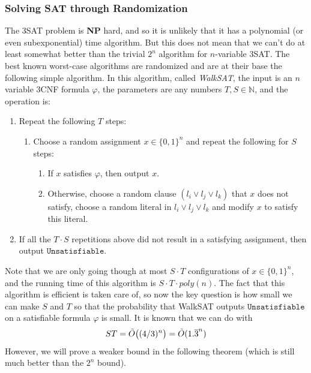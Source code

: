   \subsubsection{Solving SAT through Randomization}
  The 3SAT problem is \textbf{NP} hard, and so it is unlikely that it has a polynomial (or even subexponential) time algorithm. But this does not mean that we can't do at least somewhat better than the trivial $2^n$ algorithm for $n$-variable 3SAT. The best known worst-case algorithms are randomized and are at their base the following simple algorithm. In this algorithm, called \textit{WalkSAT}, the input is an $n$ variable 3CNF formula $\varphi$, the parameters are any numbers $T, S \in \mathbb{N}$, and the operation is: 
  \begin{enumerate}
      \item Repeat the following $T$ steps: 
      \begin{enumerate}
          \item Choose a random assignment $x \in \{0,1\}^n$ and repeat the following for $S$ steps: 
          \begin{enumerate}
              \item If $x$ satisfies $\varphi$, then output $x$. 
              \item Otherwise, choose a random clause $(l_i \vee l_j \vee l_k)$ that $x$ does not satisfy, choose a random literal in $l_i \vee l_j \vee l_k$ and modify $x$ to satisfy this literal. 
          \end{enumerate}
      \end{enumerate}
      \item If all the $T \cdot S$ repetitions above did not result in a satisfying assignment, then output $\texttt{Unsatisfiable}$. 
  \end{enumerate}
  Note that we are only going though at most $S\cdot T$ configurations of $x \in \{0,1\}^n$, and the running time of this algorithm is $S \cdot T \cdot poly(n)$. The fact that this algorithm is efficient is taken care of, so now the key question is how small we can make $S$ and $T$ so that the probability that WalkSAT outputs $\texttt{Unsatisfiable}$ on a satisfiable formula $\varphi$ is small. It is known that we can do with 
  \begin{equation}
    ST = \Tilde{O} \big( (4/3)^n \big) = \Tilde{O} ( 1.\overline{3}^n)
  \end{equation}
  However, we will prove a weaker bound in the following theorem (which is still much better than the $2^n$ bound). 

